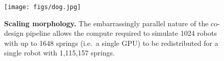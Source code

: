 \begin{figure}[t]
    \centering
    \texttt{[image: figs/dog.jpg]}
    \caption{\textbf{Scaling morphology.}
    The embarrassingly parallel nature of the co-design pipeline
    allows the compute required to simulate 1024 robots with up to 1648 springs 
    (i.e.~a single GPU)
    to be redistributed 
    for a single robot with 1,115,157 springs.
    }
    \vspace{-10pt}
    \label{fig:results-dog}
\end{figure}